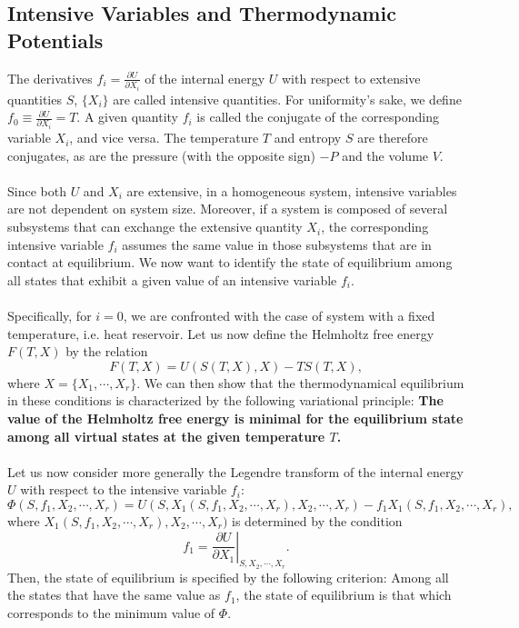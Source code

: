 \subsection{Intensive Variables and Thermodynamic Potentials}
The derivatives $f_i = \frac{\partial U}{\partial X_i}$ of the internal energy $U$ with respect to extensive quantities $S$, $\{X_i\}$ are called intensive quantities. For uniformity's sake, we define $f_0 \equiv \frac{\partial U}{\partial X_i} = T$. A given quantity $f_i$ is called the conjugate of the corresponding variable $X_i$, and vice versa. The temperature $T$ and entropy $S$ are therefore conjugates, as are the pressure (with the opposite sign) $-P$ and the volume $V$.
\\ \\
Since both $U$ and $X_i$ are extensive, in a homogeneous system, intensive variables are not dependent on system size. Moreover, if a system is composed of several subsystems that can exchange the extensive quantity $X_i$, the corresponding intensive variable $f_i$ assumes the same value in those subsystems that are in contact at equilibrium.
We now want to identify the state of equilibrium among all states that exhibit a given value of an intensive variable $f_i$. 
\\ \\
Specifically, for $i = 0$, we are confronted with the case of system with a fixed temperature, i.e. heat reservoir.
Let us now define the Helmholtz free energy $F(T,X) $ by the relation
\[F(T,X) = U(S(T,X),X) - TS(T,X),\]
where $X = \{ X_1,\cdots,X_r\}$.
We can then show that the thermodynamical equilibrium in these conditions is characterized by the following variational principle:
\textbf{The value of the Helmholtz free energy is minimal for the equilibrium state among all virtual states at the given temperature $T$.}
\\ \\
Let us now consider more generally the Legendre transform of the internal energy $U$ with respect to the intensive variable $f_i$:
\[\Phi(S,f_1,X_2,\cdots,X_r) = U(S,X_1(S,f_1,X_2,\cdots,X_r),X_2,\cdots,X_r) - f_1 X_1 (S,f_1,X_2,\cdots,X_r),\]
where $X_1(S,f_1,X_2,\cdots,X_r),X_2,\cdots,X_r)$ is determined by the condition
\[f_1 =\left. \frac{\partial U}{\partial X_1} \right |_{S,X_2,\cdots,X_r}.\]
Then, the state of equilibrium is specified by the following criterion:
Among all the states that have the same value as $f_1$, the state of equilibrium is that which corresponds to the minimum value of $\Phi$.
\\ \\
